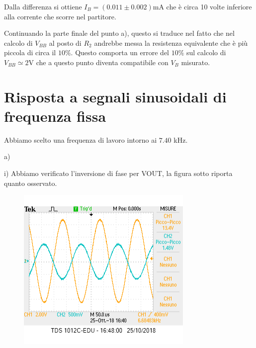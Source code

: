 \documentclass[10pt,a4paper]{article}
\begin{document}
Dalla differenza si ottiene $I_B = (0.011\pm 0.002) \si{\milli\ampere} $ che è circa 10 volte inferiore alla corrente che scorre nel partitore.

Continuando la parte finale del punto a), questo si traduce nel fatto che nel calcolo di $V_{BB}$ al posto di $R_2 $ andrebbe messa la resistenza equivalente che è più piccola di circa il $10\%$. Questo comporta un errore del $10\% $ sul calcolo di $V_{BB}\simeq 2\si{\volt}$ che a questo punto diventa compatibile con $V_{B}$ misurato.



\section{Risposta a segnali sinusoidali di frequenza fissa}

Abbiamo scelto una frequenza di lavoro intorno ai $7.40$ \si{\kilo\hertz}.

a) 
\vspace{0.5cm}

i)  Abbiamo verificato l'inversione di fase per VOUT, la figura sotto riporta quanto osservato.

\begin{figure}[h]
	\centering
	\includegraphics[scale=0.5]{oscilloscopio.png}

	
	
\end{figure}
\end{document}
